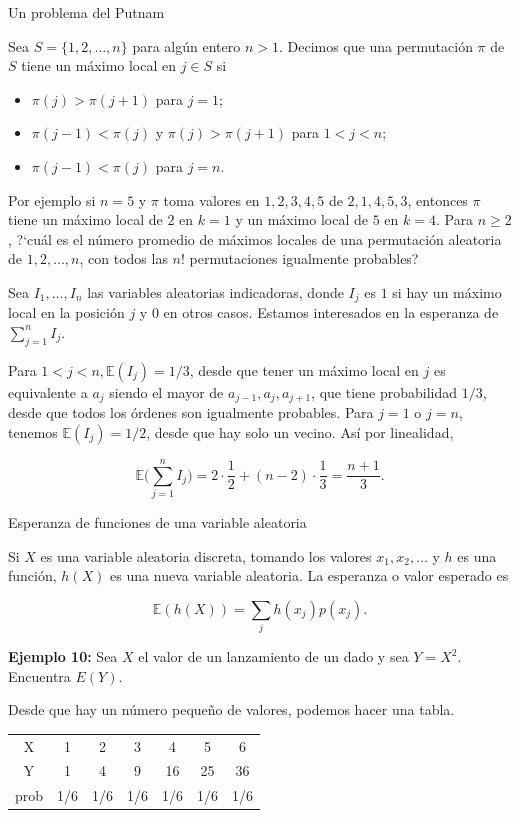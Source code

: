 \documentclass[10pt]{beamer}
\begin{document}
\begin{frame}{Un problema del Putnam}
	
\scriptsize{ Sea $S = \{1, 2, \dots, n\}$ para alg\'un entero $n > 1$. Decimos que una permutaci\'on $\pi$ de $S$ tiene un m\'aximo local en $j \in S$ si
	
\begin{itemize}
	\item $\pi(j) > \pi(j + 1)$ para $j =1$;
	\item $\pi(j -1) < \pi(j)$ y $\pi(j) > \pi(j + 1)$ para $1 < j < n$;
	\item $\pi(j -1) < \pi(j)$ para $j = n$.
\end{itemize}

Por ejemplo si $n = 5$ y $\pi$ toma valores en $1, 2, 3, 4, 5$ de $2, 1, 4, 5, 3$, entonces $\pi$ tiene un m\'aximo local de $2$ en $k =1$ y un m\'aximo local de $5$ en $k =4$. Para $n \geq 2$, ?`cu\'al es el n\'umero promedio de m\'aximos locales de una permutaci\'on aleatoria de $1, 2,\dots, n$, con todos las $n!$ permutaciones igualmente probables?
}

\scriptsize{ Sea $I_1 , \dots, I_n$} las variables aleatorias indicadoras, donde $I_j$ es $1$ si hay un m\'aximo local en la posici\'on $j$ y $0$ en otros casos. Estamos interesados en la esperanza de $\displaystyle \sum_{j =1}^{n}I_j$.

Para $1 < j < n, \mathbb{E}(I_j) = 1/3$, desde que tener un m\'aximo local en $j$ es equivalente a $a_j$ siendo el mayor de $a_{j -1}, a_j, a_{j +1}$, que tiene probabilidad $1/3$, desde que todos los \'ordenes son igualmente probables. Para $j =1$ o $j =n$, tenemos $\mathbb{E}(I_j) = 1/2$, desde que hay solo un vecino. As\'i por linealidad,

\[
\mathbb{E}\biggl(\sum_{j =1}^{n}I_j \biggr) = 2\cdot\frac{1}{2} + (n -2)\cdot\frac{1}{3} = \frac{n + 1}{3}.
\]

\end{frame}
\begin{frame}{Esperanza de funciones de una variable aleatoria}
\small{ Si $X$ es una variable aleatoria discreta, tomando los valores $x_1, x_2, \dots$ y $h$ es una funci\'on, $h(X)$ es una nueva variable aleatoria. La esperanza o valor esperado es

\[
\mathbb{E}(h(X)) = \sum_{j}h(x_j)p(x_j).
\]	

\textbf{Ejemplo 10: } Sea $X$ el valor de un lanzamiento de un dado y sea $Y = X^2$. Encuentra $E(Y)$.

Desde que hay un n\'umero peque\~no de valores, podemos hacer una tabla.

\begin{table}[]
	\centering
	\begin{tabular}{ccccccc}
		X    & 1   & 2   & 3   & 4   & 5   & 6   \\
		Y    & 1   & 4   & 9   & 16  & 25  & 36  \\
		prob & 1/6 & 1/6 & 1/6 & 1/6 & 1/6 & 1/6
	\end{tabular}
\end{table}


}
\end{frame}
\end{document}
